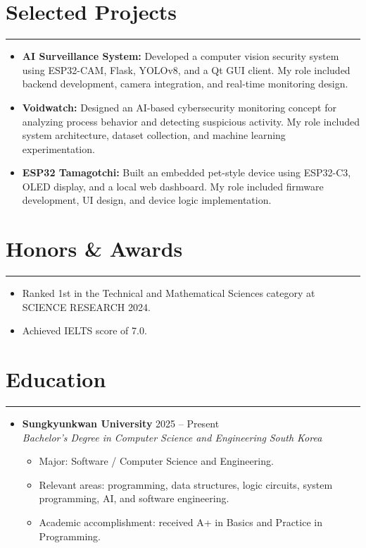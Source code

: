 \documentclass[letterpaper, 10pt]{article}
\begin{document}
\section*{Selected Projects}
\hrule
\vspace{4pt}
\begin{itemize}
    \item \textbf{AI Surveillance System:} Developed a computer vision security system using ESP32-CAM, Flask, YOLOv8, and a Qt GUI client. My role included backend development, camera integration, and real-time monitoring design.

    \item \textbf{Voidwatch:} Designed an AI-based cybersecurity monitoring concept for analyzing process behavior and detecting suspicious activity. My role included system architecture, dataset collection, and machine learning experimentation.


    \item \textbf{ESP32 Tamagotchi:} Built an embedded pet-style device using ESP32-C3, OLED display, and a local web dashboard. My role included firmware development, UI design, and device logic implementation.
\end{itemize}

\section*{Honors \& Awards}
\hrule
\vspace{4pt}
\begin{itemize}
    \item Ranked 1st in the Technical and Mathematical Sciences category at SCIENCE RESEARCH 2024.
    \item Achieved IELTS score of 7.0.
\end{itemize}

\section*{Education}
\hrule
\vspace{4pt}
\begin{itemize}
    \item \textbf{Sungkyunkwan University} \hfill 2025 -- Present \\
    \textit{Bachelor's Degree in Computer Science and Engineering} \hfill \textit{South Korea}
    \begin{itemize}
        \item Major: Software / Computer Science and Engineering.
        \item Relevant areas: programming, data structures, logic circuits, system programming, AI, and software engineering.
        \item Academic accomplishment: received A+ in Basics and Practice in Programming.
    \end{itemize}
\end{itemize}

\end{document}
